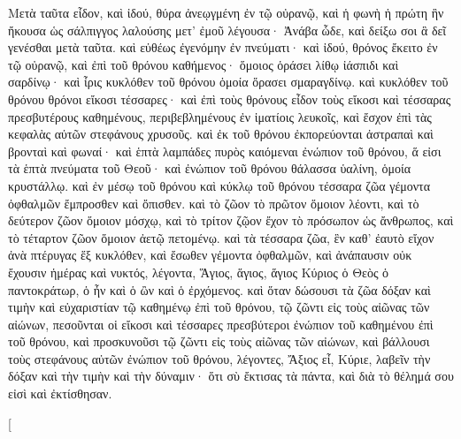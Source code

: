 \begin{pages}
    \begin{Leftside}
        \beginnumbering
		Μετὰ ταῦτα εἶδον, καὶ ἰδού, θύρα ἀνεῳγμένη ἐν τῷ οὐρανῷ, καὶ ἡ φωνὴ ἡ πρώτη ἣν ἤκουσα ὡς σάλπιγγος λαλούσης μετ’ ἐμοῦ λέγουσα· Ἀνάβα ὧδε, καὶ δείξω σοι ἃ δεῖ γενέσθαι μετὰ ταῦτα. καὶ εὐθέως ἐγενόμην ἐν πνεύματι· καὶ ἰδού, θρόνος ἔκειτο ἐν τῷ οὐρανῷ, καὶ ἐπὶ τοῦ θρόνου καθήμενος· ὅμοιος ὁράσει λίθῳ ἰάσπιδι καὶ σαρδίνῳ· καὶ ἶρις κυκλόθεν τοῦ θρόνου ὁμοία ὅρασει σμαραγδίνῳ. καὶ κυκλόθεν τοῦ θρόνου θρόνοι εἴκοσι τέσσαρες· καὶ ἐπὶ τοὺς θρόνους εἶδον τοὺς εἴκοσι καὶ τέσσαρας πρεσβυτέρους καθημένους, περιβεβλημένους ἐν ἱματίοις λευκοῖς, καὶ ἔσχον ἐπὶ τὰς κεφαλὰς αὐτῶν στεφάνους χρυσοῦς. καὶ ἐκ τοῦ θρόνου ἐκπορεύονται ἀστραπαὶ καὶ βρονταὶ καὶ φωναί· καὶ ἑπτὰ λαμπάδες πυρὸς καιόμεναι ἐνώπιον τοῦ θρόνου, ἅ εἰσι τὰ ἑπτὰ πνεύματα τοῦ Θεοῦ· καὶ ἐνώπιον τοῦ θρόνου θάλασσα ὑαλίνη, ὁμοία κρυστάλλῳ. 
		\pend
		\pstart
		καὶ ἐν μέσῳ τοῦ θρόνου καὶ κύκλῳ τοῦ θρόνου τέσσαρα ζῶα γέμοντα ὀφθαλμῶν ἔμπροσθεν καὶ ὄπισθεν. καὶ τὸ ζῶον τὸ πρῶτον ὅμοιον λέοντι, καὶ τὸ δεύτερον ζῶον ὅμοιον μόσχῳ, καὶ τὸ τρίτον ζῷον ἔχον τὸ πρόσωπον ὡς ἄνθρωπος, καὶ τὸ τέταρτον ζῶον ὅμοιον ἀετῷ πετομένῳ. καὶ τὰ τέσσαρα ζῶα, ἓν καθ’ ἐαυτὸ εἴχον ἀνὰ πτέρυγας ἕξ κυκλόθεν, καὶ ἔσωθεν γέμοντα ὀφθαλμῶν, καὶ ἀνάπαυσιν οὐκ ἔχουσιν ἡμέρας καὶ νυκτός, λέγοντα, Ἅγιος, ἅγιος, ἅγιος Κύριος ὁ Θεὸς ὁ παντοκράτωρ, ὁ ἦν καὶ ὁ ὢν καὶ ὁ ἐρχόμενος. 
		\pend
		\pstart
		καὶ ὅταν δώσουσι τὰ ζῶα δόξαν καὶ τιμὴν καὶ εὐχαριστίαν τῷ καθημένῳ ἐπὶ τοῦ θρόνου, τῷ ζῶντι εἰς τοὺς αἰῶνας τῶν αἰώνων, πεσοῦνται οἱ εἴκοσι καὶ τέσσαρες πρεσβύτεροι ἐνώπιον τοῦ καθημένου ἐπὶ τοῦ θρόνου, καὶ προσκυνοῦσι τῷ ζῶντι εἰς τοὺς αἰῶνας τῶν αἰώνων, καὶ βάλλουσι τοὺς στεφάνους αὐτῶν ἐνώπιον τοῦ θρόνου, λέγοντες, Ἄξιος εἶ, Κύριε, λαβεῖν τὴν δόξαν καὶ τὴν τιμὴν καὶ τὴν δύναμιν· ὅτι σὺ ἔκτισας τὰ πάντα, καὶ διὰ τὸ θέλημά σου εἰσὶ καὶ ἐκτίσθησαν.
		\pend
        \endnumbering
    \end{Leftside}
    \begin{Rightside}
        \beginnumbering
        \pstart[

\end{Rightside}
\end{pages}
